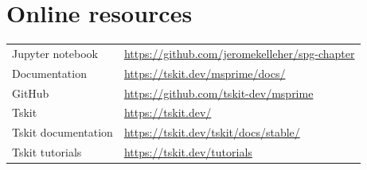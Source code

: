 \documentclass[graybox]{svmult}
\begin{document}
\section*{Online resources}

\begin{tabular}{ll}
Jupyter notebook & \url{https://github.com/jeromekelleher/spg-chapter} \\
Documentation & \url{https://tskit.dev/msprime/docs/} \\
GitHub & \url{https://github.com/tskit-dev/msprime} \\
Tskit & \url{https://tskit.dev/} \\
Tskit documentation & \url{https://tskit.dev/tskit/docs/stable/} \\
Tskit tutorials & \url{https://tskit.dev/tutorials} \\
\end{tabular}


\end{document}
